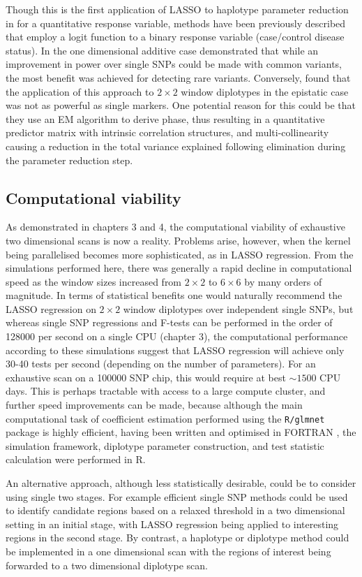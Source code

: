 Though this is the first application of LASSO to haplotype parameter reduction in for a quantitative response variable, methods have been previously described that employ a logit function to a binary response variable (case/control disease status). In the one dimensional additive case \citet{Guo2009} demonstrated that while an improvement in power over single SNPs could be made with common variants, the most benefit was achieved for detecting rare variants. Conversely, \citet{Li2010} found that the application of this approach to $2 \times 2$ window diplotypes in the epistatic case was not as powerful as single markers. One potential reason for this could be that they use an EM algorithm to derive phase, thus resulting in a quantitative predictor matrix with intrinsic correlation structures, and multi-collinearity causing a reduction in the total variance explained following elimination during the parameter reduction step.


\subsection{Computational viability}

As demonstrated in chapters 3 and 4, the computational viability of exhaustive two dimensional scans is now a reality. Problems arise, however, when the kernel being parallelised becomes more sophisticated, as in LASSO regression. From the simulations performed here, there was generally a rapid decline in computational speed as the window sizes increased from $2 \times 2$ to $6 \times 6$ by many orders of magnitude. In terms of statistical benefits one would naturally recommend the LASSO regression on $2 \times 2$ window diplotypes over independent single SNPs, but whereas single SNP regressions and F-tests can be performed in the order of 128000 per second on a single CPU (chapter 3), the computational performance according to these simulations suggest that LASSO regression will achieve only 30-40 tests per second (depending on the number of parameters). For an exhaustive scan on a 100000 SNP chip, this would require at best $\sim 1500$ CPU days. This is perhaps tractable with access to a large compute cluster, and further speed improvements can be made, because although the main computational task of coefficient estimation performed using the {\tt R/glmnet} package is highly efficient, having been written and optimised in FORTRAN \citep{Friedman2010}, the simulation framework, diplotype parameter construction, and test statistic calculation were performed in R.

An alternative approach, although less statistically desirable, could be to consider using single two stages. For example efficient single SNP methods could be used to identify candidate regions based on a relaxed threshold in a two dimensional setting in an initial stage, with LASSO regression being applied to interesting regions in the second stage. By contrast, a haplotype or diplotype method could be implemented in a one dimensional scan with the regions of interest being forwarded to a two dimensional diplotype scan.

